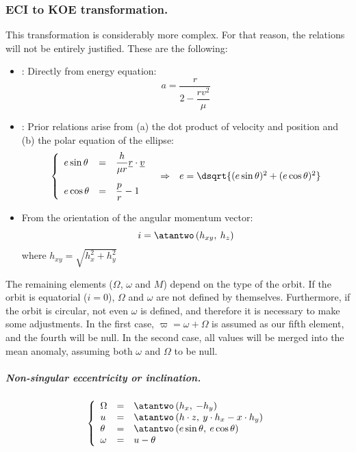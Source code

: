 		\subsubsection{ECI to KOE transformation.}
		\indent This transformation is considerably more complex. For that reason, the relations will not be entirely justified. These are the following:
		\begin{itemize}
		\item[\GMVred{$\bullet$}] : Directly from energy equation:
		\[
		a = \dfrac{r}{2 - \dfrac{r v^2}{\mu}}
		\]
		\item[\GMVred{$\bullet$}] : Prior relations arise from (a) the dot product of velocity and position and (b) the polar equation of the ellipse:
		\[
		\begin{array}{ccc}
		\left\{ \begin{array}{lll}
		e\sin\theta & = & \dfrac{h}{\mu r} \underline{r} \cdot \underline{v}\\[1.5em]
		e\cos\theta & = & \dfrac{p}{r} - 1
		\end{array}\right. 
		&
		\Rightarrow
		& 
		e = \dsqrt{(e\sin\theta)^2 + (e\cos\theta)^2}
		\end{array}
		\]
		\item[\GMVred{$\bullet$}]  From the orientation of the angular momentum vector:
		\[
		i = \atantwo\left( h_{xy},\: h_z \right)
		\]
		\noindent where $h_{xy} = \sqrt{h_x^2 + h_y^2}$
		\end{itemize}
		\indent The remaining elements ($\Omega$, $\omega$ and $M$) depend on the type of the orbit. If the orbit is equatorial ($i=0$), $\Omega$ and $\omega$ are not defined by themselves. Furthermore, if the orbit is circular, not even $\omega$ is defined, and therefore it is necessary to make some adjustments. In the first case, $\varpi = \omega + \Omega $ is assumed as our fifth element, and the fourth will be null. In the second case, all values will be merged into the mean anomaly, assuming both $\omega$ and $\Omega$ to be null.\\
		\subparagraph{ Non-singular eccentricity or inclination.\\}
		\[
		\left\{
		\begin{array}{lll}
		\Omega 	& = & \atantwo\left( h_x,\: -h_y\right)\\
		u 		& = & \atantwo\left( h \cdot z,\: y\cdot h_x - x \cdot h_y\right)\\
		\theta 	& = & \atantwo\left(e\sin\theta,\: e\cos\theta\right)\\
		\omega 	& = & u - \theta
		\end{array}\right.
		\]
